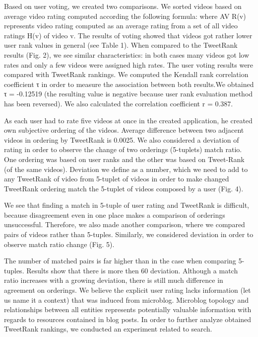 \documentclass[]{article}
\begin{document}
Based on user voting, we created two comparisons. We sorted videos based
on average video rating computed according the following formula:
where AV R(v) represents video rating computed as an average rating from a set
of all video ratings H(v) of video v.
The results of voting showed that videos got rather lower user rank values in
general (see Table 1). When compared to the TweetRank results (Fig. 2), we
see similar characteristics: in both cases many videos got low rates and only a
few videos were assigned high rates. The user voting results were compared with
TweetRank rankings. We computed the Kendall rank correlation coefficient τ in
order to measure the association between both results.We obtained τ = -0.12519
(the resulting value is negative because user rank evaluation method has been
reversed). We also calculated the correlation coefficient r = 0.387.

As each user had to rate five videos at once in the created application, he
created own subjective ordering of the videos. Average difference between two
adjacent videos in ordering by TweetRank is 0.0025. We also considered a deviation
of rating in order to observe the change of two orderings (5-tuplets)
match ratio. One ordering was based on user ranks and the other was based on
Tweet-Rank (of the same videos). Deviation we define as a number, which we
need to add to any TweetRank of video from 5-tuplet of videos in order to make
changed TweetRank ordering match the 5-tuplet of videos composed by a user
(Fig. 4).

We see that finding a match in 5-tuple of user rating and TweetRank is
difficult, because disagreement even in one place makes a comparison of orderings
unsuccessful. Therefore, we also made another comparison, where we compared
pairs of videos rather than 5-tuples. Similarly, we considered deviation in order
to observe match ratio change (Fig. 5).

The number of matched pairs is far higher than in the case when comparing
5-tuples. Results show that there is more then 60 %
deviation. Although a match ratio increases with a growing deviation, there is
still much difference in agreement on orderings. We believe the explicit user rating
lacks information (let us name it a context) that was induced from microblog.
Microblog topology and relationships between all entities represents potentially  valuable information with regards to resources contained in blog posts. In order
to further analyze obtained TweetRank rankings, we conducted an experiment
related to search.
\end{document}
